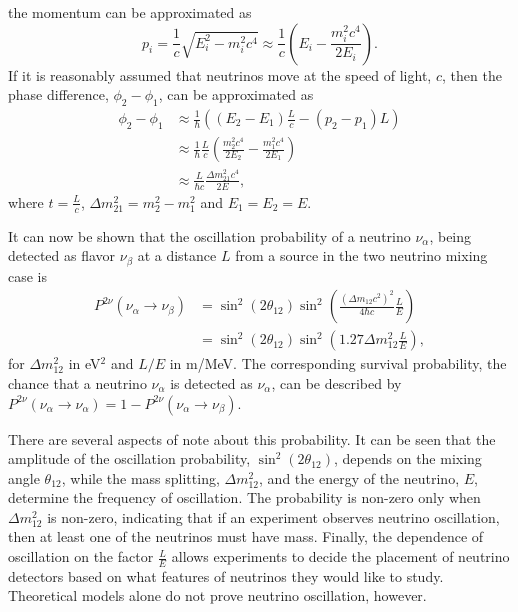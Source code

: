 the momentum can be approximated as
\begin{equation}
	p_i = \frac{1}{c}\sqrt{E^2_i-m^2_ic^4 } \approx \frac{1}{c}\left(E_i - \frac{m^2_ic^4}{2E_i} \right).
\end{equation}
If it is reasonably assumed that neutrinos move at the speed of light, $c$, then
the phase difference, $\phi_2 - \phi_1$, can be approximated as
\begin{equation}
\begin{split}
	\phi_2 - \phi_1 &\approx \frac{1}{\hbar}\left( (E_2 - E_1)\frac{L}{c} - (p_2 - p_1)L  \right)\\
	&\approx \frac{1}{\hbar}\frac{L}{c}\left(\frac{m_2^2c^4}{2E_2} - \frac{m_1^2c^4}{2E_1}\right) \\
	&\approx \frac{L}{\hbar c}\frac{\Delta m^2_{21}c^4}{2E},
\end{split}
\end{equation}
where $t = \frac{L}{c}$, $\Delta m^2_{21} = m_2^2 - m_1^2$ and $E_1 = E_2 = E$.

It can now be shown that the oscillation probability of a neutrino $\nu_\alpha$, being detected as flavor $\nu_\beta$ at a distance $L$ from a source in the two neutrino mixing case is
\begin{equation} \label{eq:oscprob}
\begin{split}
	P^{2\nu}(\nu_\alpha \rightarrow \nu_\beta) &= \sin^2\left(2\theta_{12}\right)\sin^2\left(\frac{(\Delta m_{12}c^2)^2}{4\hbar c}\frac{L}{E}\right) \\
	&= \sin^2\left(2\theta_{12}\right)\sin^2\left(1.27\Delta m^2_{12}\frac{L}{E} \right),
\end{split}
\end{equation}
for $\Delta m^2_{12}$ in eV$^2$ and $L/E$ in m/MeV.
The corresponding survival probability, the chance that a neutrino $\nu_\alpha$ is detected as $\nu_\alpha$, can be described by $P^{2\nu}(\nu_\alpha \rightarrow \nu_\alpha) = 1 - P^{2\nu}(\nu_\alpha \rightarrow \nu_\beta)$.

There are several aspects of note about this probability. It can be seen that the amplitude of the oscillation probability, $\sin^2\left(2\theta_{12}\right)$, depends on the mixing angle $\theta_{12}$, while the mass splitting, $\Delta m^2_{12}$, and the energy of the neutrino, $E$,  determine the frequency of oscillation. 
The probability is non-zero only when $\Delta m^2_{12}$ is non-zero, indicating that if an experiment observes neutrino oscillation, then at least one of the neutrinos must have mass.
Finally, the dependence of oscillation on the factor $\frac{L}{E}$ allows experiments to decide the placement of neutrino detectors based on what features of neutrinos they would like to study. 
Theoretical models alone do not prove neutrino oscillation, however.

